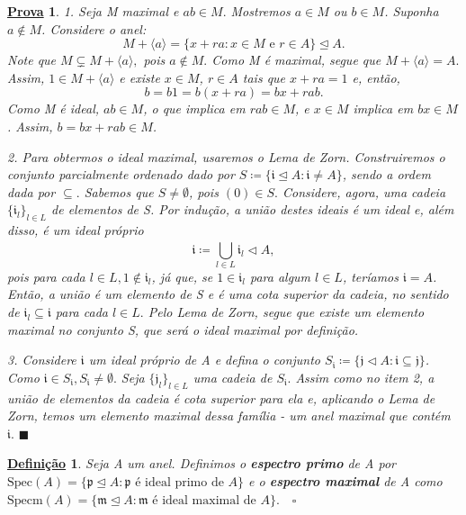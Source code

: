 \documentclass{article}
\newtheorem*{def*}{\underline{Defini\c c\~ao}}
\newtheorem*{proof*}{\underline{Prova}}
\renewcommand\qedsymbol{$\blacksquare$}
\begin{document}
\begin{proof*}
  1. Seja M maximal e \(ab\in M.\) Mostremos \(a\in M\) ou \(b\in M\). Suponha
 \(a\not\in M\). Considere o anel:
  \[
    M + \langle a \rangle = \{x+ra: x\in M\text{ e }r\in A\} \trianglelefteq{A}.
  \] 
  Note que \(M\subsetneq{M + \langle a \rangle},\) pois \(a\not\in M.\) Como M é maximal, segue que
 \(M + \langle a \rangle = A.\) Assim, \(1\in M + \langle a \rangle\) e existe \(x\in M\), \(r\in A\)
tais que \(x + ra = 1\) e, então, 
  \[
    b = b1 = b(x+ra) = bx + rab.
  \]
  Como M é ideal, \(ab\in M\), o que implica em \(rab\in M\), e \(x\in M\) implica em \(bx\in M\).
Assim, \(b = bx + rab\in M\). 

  2. Para obtermos o ideal maximal, usaremos o Lema de Zorn. Construiremos o conjunto parcialmente ordenado 
dado por \(S\coloneqq \{\mathfrak{i}\trianglelefteq{A}: \mathfrak{i}\neq A\}\), sendo a ordem dada por \(\subseteq{}.\)
Sabemos que \(S \neq\emptyset\), pois \((0)\in S.\) Considere, agora, uma cadeia \(\{\mathfrak{i}_{l}\}_{l\in L}\) de elementos
de S. Por indução, a união destes ideais é um ideal e, além disso, é um ideal próprio
  \[
    \mathfrak{i}\coloneqq \bigcup_{l\in L}^{}{\mathfrak{i}_{l}}\vartriangleleft{A},
  \]
pois para cada \(l\in L, 1\not\in \mathfrak{i}_{l}\), já que, se \(1\in \mathfrak{i}_{l}\) para algum \(l\in L\), teríamos
 \(\mathfrak{i} = A\). Então, a união é um elemento de S e é uma cota superior da cadeia, no sentido de \(\mathfrak{i}_{l}\subseteq{\mathfrak{i}}\)
para cada \(l\in L.\) Pelo Lema de Zorn, segue que existe um elemento maximal no conjunto S, que será o ideal maximal por definição.

  3. Considere \(\mathfrak{i}\) um ideal próprio de A e defina o conjunto \(S_{\mathfrak{i}}\coloneqq \{\mathfrak{j}\vartriangleleft{A}:\mathfrak{i}\subseteq{\mathfrak{j}}\}\).
Como \(\mathfrak{i}\in S_{\mathfrak{i}}, S_{\mathfrak{i}}\neq\emptyset.\) Seja \(\{\mathfrak{j}_{l}\}_{l\in L}\) uma cadeia de \(S_{\mathfrak{i}}.\)
Assim como no item 2, a união de elementos da cadeia é cota superior para ela e, aplicando o Lema de Zorn, temos um elemento
maximal dessa família - um anel maximal que contém \(\mathfrak{i}.\) 
\qedsymbol
\end{proof*}
\begin{def*}
  Seja A um anel. Definimos o \textbf{espectro primo} de A por \(\mathrm{Spec}(A) = \{\mathfrak{p}\trianglelefteq{A}: \mathfrak{p}\text{ é ideal primo de } A\}\)
e o \textbf{espectro maximal} de A como \(\mathrm{Specm}(A) = \{\mathfrak{m}\trianglelefteq{A}:\mathfrak{m} \text{ é ideal maximal de } A\}.\quad\square\)
\end{def*}
\end{document}
